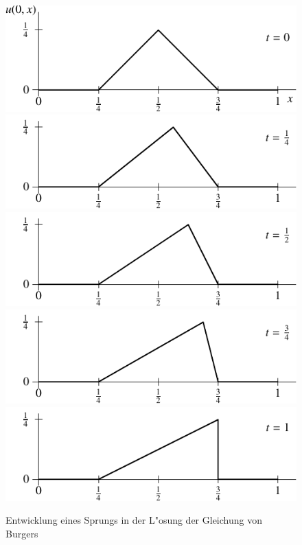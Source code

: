 \begin{figure}
\begin{center}
\includegraphics[width=0.8\hsize]{images/burgers-1}
\includegraphics[width=0.8\hsize]{images/burgers-3}
\includegraphics[width=0.8\hsize]{images/burgers-4}
\includegraphics[width=0.8\hsize]{images/burgers-5}
\includegraphics[width=0.8\hsize]{images/burgers-6}
\end{center}
\caption{Entwicklung eines Sprungs in der L"osung der Gleichung von Burgers\label{burgerssprung}}
\end{figure}


